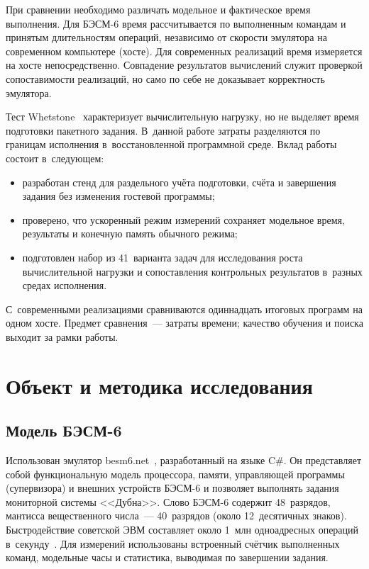\documentclass[a4paper,12pt]{article}
\begin{document}
При сравнении необходимо различать модельное и фактическое время выполнения. Для БЭСМ-6 время рассчитывается по выполненным командам и принятым длительностям операций, независимо от скорости эмулятора на современном компьютере (хосте). Для современных реализаций время измеряется на хосте непосредственно. Совпадение результатов вычислений служит проверкой сопоставимости реализаций, но само по себе не доказывает корректность эмулятора.

Тест Whetstone~\cite{whetstone} характеризует вычислительную нагрузку, но не выделяет время подготовки пакетного задания. В~данной работе затраты разделяются по границам исполнения в~восстановленной программной среде. Вклад работы состоит в~следующем:
\begin{itemize}\raggedright\itemsep=0pt\parskip=0pt
\item разработан стенд для раздельного учёта подготовки, счёта и завершения задания без изменения гостевой программы;
\item проверено, что ускоренный режим измерений сохраняет модельное время, результаты и конечную память обычного режима;
\item подготовлен набор из 41~варианта задач для исследования роста вычислительной нагрузки и сопоставления контрольных результатов в~разных средах исполнения.
\end{itemize}

С~современными реализациями сравниваются одиннадцать итоговых программ на одном хосте. Предмет сравнения~--- затраты времени; качество обучения и поиска выходит за рамки работы.

\section{Объект и методика исследования}

\subsection{Модель БЭСМ-6}

Использован эмулятор besm6.net~\cite{besm6net}, разработанный на языке C\#. Он представляет собой функциональную модель процессора, памяти, управляющей программы (супервизора) и внешних устройств БЭСМ-6 и позволяет выполнять задания мониторной системы <<Дубна>>. Слово БЭСМ-6 содержит 48~разрядов, мантисса вещественного числа~--- 40~разрядов (около 12~десятичных знаков). Быстродействие советской ЭВМ составляет около 1~млн одноадресных операций в~секунду~\cite{saltykov}. Для измерений использованы встроенный счётчик выполненных команд, модельные часы и статистика, выводимая по завершении задания.
\end{document}
